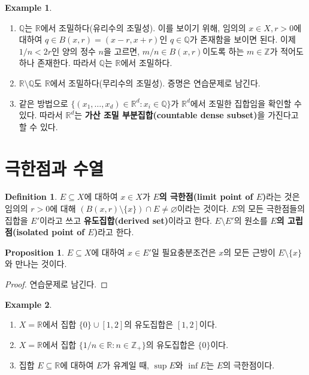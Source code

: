\documentclass[11pt]{book}
\numberwithin{equation}{chapter}
\def\ZZ{\mathbb{Z}}
\def\QQ{\mathbb{Q}}
\def\RR{\mathbb{R}}
\theoremstyle{definition}
\newtheorem{prop}[thm]{Proposition}
\newtheorem{defn}[thm]{Definition}
\newtheorem*{ex}{Example}
\begin{document}
\begin{ex}
    \quad

    \begin{enumerate} [label=(\alph*), leftmargin=2\parindent]
        \item \(\QQ\)는 \(\RR\)에서 조밀하다(유리수의 조밀성). 이를 보이기 위해, 임의의 \(x \in X, r > 0\)에 대하여 \(q \in B(x, r) = (x -r, x+r)\)인 \(q \in \QQ\)가 존재함을 보이면 된다. 이제 \(1/n < 2r\)인 양의 정수 \(n\)을 고르면, \(m/n \in B(x, r)\)이도록 하는 \(m \in \ZZ\)가 적어도 하나 존재한다. 따라서 \(\QQ\)는 \(\RR\)에서 조밀하다.
        \item \(\RR \setminus \QQ\)도 \(\RR\)에서 조밀하다(무리수의 조밀성). 증명은 연습문제로 남긴다.
        \item 같은 방법으로 \(\{(x_1, \ldots, x_d) \in \RR^d : x_i \in \QQ\}\)가 \(\RR^d\)에서 조밀한 집합임을 확인할 수 있다. 따라서 \(\RR^d\)는 \textbf{가산 조밀 부분집합(countable dense subset)}을 가진다고 할 수 있다.
    \end{enumerate}
\end{ex}



\section{극한점과 수열}

\begin{defn}
    \(E \subseteq X\)에 대하여 \(x \in X\)가 \textbf{\(E\)의 극한점(limit point of \(E\))}라는 것은 임의의 \(r > 0\)에 대해 \((B(x, r)\setminus \{x\}) \cap E \ne \varnothing\)이라는 것이다. \(E\)의 모든 극한점들의 집합을 \(E'\)이라고 쓰고 \textbf{유도집합(derived set)}이라고 한다. \(E \setminus E'\)의 원소를 \textbf{\(E\)의 고립점(isolated point of \(E\))}라고 한다.
\end{defn}

\begin{prop}
    \(E \subseteq X\)에 대하여 \(x \in E'\)일 필요충분조건은 \(x\)의 모든 근방이 \(E \setminus \{x\}\)와 만나는 것이다.
\end{prop}
\begin{proof}
    연습문제로 남긴다.
\end{proof}

\begin{ex}
    \quad

    \begin{enumerate} [label=(\alph*), leftmargin=2\parindent]
        \item \(X = \RR\)에서 집합 \(\{0\} \cup [1, 2]\)의 유도집합은 \([1, 2]\)이다.
        \item \(X = \RR\)에서 집합 \(\{1/n \in \RR : n \in \ZZ_+\}\)의 유도집합은 \(\{0\}\)이다.
        \item 집합 \(E \subseteq \RR\)에 대하여 \(E\)가 유계일 때, \(\sup E\)와 \(\inf E\)는 \(E\)의 극한점이다.
    \end{enumerate}
\end{ex}
\end{document}
